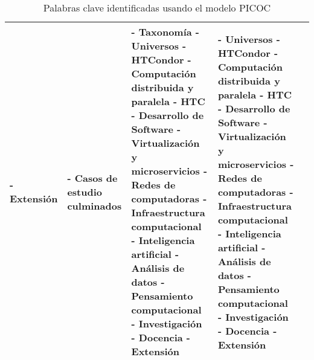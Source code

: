\begin{table}[H]
\begin{tabular}{|p{2.8cm}|p{2.8cm}|p{2.0cm}|p{2.8cm}|p{2.8cm}|}
		- Extensión                   &
		- Casos de estudio culminados &
		- Taxonomía \newline
		- Universos \newline
		- HTCondor \newline
		- Computación distribuida y paralela \newline
		- HTC \newline
		- Desarrollo de Software \newline
		- Virtualización y microservicios \newline
		- Redes de computadoras \newline
		- Infraestructura computacional \newline
		- Inteligencia artificial \newline
		- Análisis de datos \newline
		- Pensamiento computacional \newline
		- Investigación \newline
		- Docencia \newline
		- Extensión                   &
		- Universos \newline
		- HTCondor \newline
		- Computación distribuida y paralela \newline
		- HTC \newline
		- Desarrollo de Software \newline
		- Virtualización y microservicios \newline
		- Redes de computadoras \newline
		- Infraestructura computacional \newline
		- Inteligencia artificial \newline
		- Análisis de datos \newline
		- Pensamiento computacional \newline
		- Investigación \newline
		- Docencia \newline
		- Extensión                                                                                                                     \\
		\hline
	\end{tabular}
	\caption{Palabras clave identificadas usando el modelo PICOC}
	\label{tab:picoc}
\end{table}

